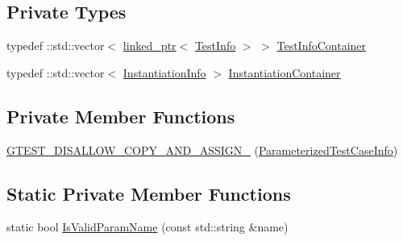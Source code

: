 \subsection*{Private Types}
\begin{DoxyCompactItemize}
\item 
typedef \+::std\+::vector$<$ \mbox{\hyperlink{classtesting_1_1internal_1_1linked__ptr}{linked\+\_\+ptr}}$<$ \mbox{\hyperlink{structtesting_1_1internal_1_1_parameterized_test_case_info_1_1_test_info}{Test\+Info}} $>$ $>$ \mbox{\hyperlink{classtesting_1_1internal_1_1_parameterized_test_case_info_aeabb0c5fa88a11a0b9037167a57d6922}{Test\+Info\+Container}}
\item 
typedef \+::std\+::vector$<$ \mbox{\hyperlink{structtesting_1_1internal_1_1_parameterized_test_case_info_1_1_instantiation_info}{Instantiation\+Info}} $>$ \mbox{\hyperlink{classtesting_1_1internal_1_1_parameterized_test_case_info_acf93d7726e6d55e312ac89c51379110c}{Instantiation\+Container}}
\end{DoxyCompactItemize}
\subsection*{Private Member Functions}
\begin{DoxyCompactItemize}
\item 
\mbox{\hyperlink{classtesting_1_1internal_1_1_parameterized_test_case_info_a838031a1ebad654ac47be69ec5ec3f0a}{G\+T\+E\+S\+T\+\_\+\+D\+I\+S\+A\+L\+L\+O\+W\+\_\+\+C\+O\+P\+Y\+\_\+\+A\+N\+D\+\_\+\+A\+S\+S\+I\+G\+N\+\_\+}} (\mbox{\hyperlink{classtesting_1_1internal_1_1_parameterized_test_case_info}{Parameterized\+Test\+Case\+Info}})
\end{DoxyCompactItemize}
\subsection*{Static Private Member Functions}
\begin{DoxyCompactItemize}
\item 
static bool \mbox{\hyperlink{classtesting_1_1internal_1_1_parameterized_test_case_info_a2e5ef36510c01934c07889a5f60e9ed8}{Is\+Valid\+Param\+Name}} (const std\+::string \&name)
\end{DoxyCompactItemize}

